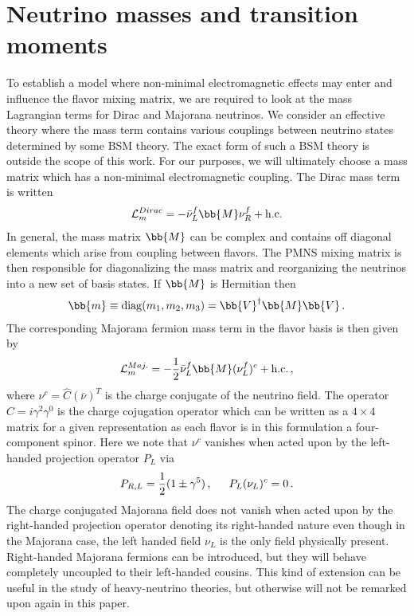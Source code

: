 \section{Neutrino masses and transition moments}
\noindent To establish a model where non-minimal electromagnetic effects may enter and influence the flavor mixing matrix, we are required to look at the mass Lagrangian terms for Dirac and Majorana neutrinos. We consider an effective theory where the mass term contains various couplings between neutrino states determined by some BSM theory. The exact form of such a BSM theory is outside the scope of this work. For our purposes, we will ultimately choose a mass matrix which has a non-minimal electromagnetic coupling. The Dirac mass term is written
\begin{alignat}{1}
	\label{mass:eq:01} \mathcal{L}_{m}^{Dirac} = -\bar{\nu}^{f}_{L}\bb{M}\nu^{f}_{R}+\mathrm{h.c.}
\end{alignat}
In general, the mass matrix $\bb{M}$ can be complex and contains off diagonal elements which arise from coupling between flavors. The PMNS mixing matrix is then responsible for diagonalizing the mass matrix and reorganizing the neutrinos into a new set of basis states. If $\bb{M}$ is Hermitian then
\begin{alignat}{1}
	\label{mass:eq:02} \bb{m} \equiv \mathrm{diag}(m_{1}, m_{2}, m_{3}) = \bb{V}^{\dagger}\bb{M}\bb{V}\,.
\end{alignat}
The corresponding Majorana fermion mass term in the flavor basis is then given by
\begin{alignat}{1}
	\label{mass:eq:03} \mathcal{L}_{m}^{Maj.} = -\frac{1}{2}\bar{\nu}^{f}_{L}\bb{M}(\nu^{f}_{L})^{c}+\mathrm{h.c.}\,,
\end{alignat}
where $\nu^{c} = \hat{C}(\bar{\nu})^{T}$ is the charge conjugate of the neutrino field. The operator $\hat{C} = i\gamma^{2}\gamma^{0}$ is the charge cojugation operator which can be written as a $4\times4$ matrix for a given representation as each flavor is in this formulation a four-component spinor. Here we note that $\nu^{c}$ vanishes when acted upon by the left-handed projection operator $P_{L}$ via
\begin{alignat}{1}
	\label{mass:eq:04} P_{R,L} = \frac{1}{2}(1\pm\gamma^{5})\,,\indent P_{L}(\nu_{L})^{c}=0\,.
\end{alignat}
The charge conjugated Majorana field does not vanish when acted upon by the right-handed projection operator denoting its right-handed nature even though in the Majorana case, the left handed field $\nu_{L}$ is the only field physically present. Right-handed Majorana fermions can be introduced, but they will behave completely uncoupled to their left-handed cousins. This kind of extension can be useful in the study of heavy-neutrino theories, but otherwise will not be remarked upon again in this paper.

